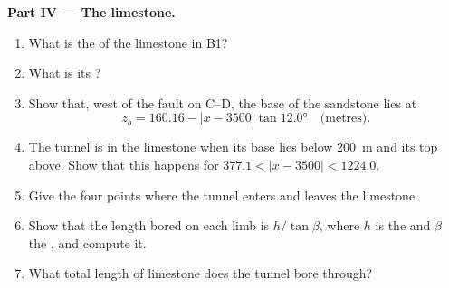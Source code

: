 \begin{problem}
\medskip
\noindent\textbf{Part IV --- The limestone.}
\begin{enumerate}[resume]
  \item What is the  of the limestone in B1?
  \item What is its ?
  \item Show that, west of the fault on C--D, the base of the sandstone lies
        at
        \[ z_b = 160.16 - |x - 3500|\tan\ang{12.0} \quad\text{(metres)}. \]
  \item The tunnel is in the limestone when its base lies below \qty{200}{m}
        and its top above. Show that this happens for $377.1 < |x - 3500|
        < 1224.0$.
  \item Give the four points where the tunnel enters and leaves the
        limestone.
  \item Show that the length bored on each limb is $h/\tan\beta$, where $h$
        is the  and $\beta$ the , and compute
        it.
  \item What total length of limestone does the tunnel bore through?
\end{enumerate}
\end{problem}
